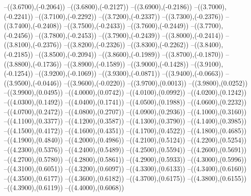 {	--({\sx*(3.6700)},{\sy*(-0.2064)})
	--({\sx*(3.6800)},{\sy*(-0.2127)})
	--({\sx*(3.6900)},{\sy*(-0.2186)})
	--({\sx*(3.7000)},{\sy*(-0.2241)})
	--({\sx*(3.7100)},{\sy*(-0.2292)})
	--({\sx*(3.7200)},{\sy*(-0.2337)})
	--({\sx*(3.7300)},{\sy*(-0.2376)})
	--({\sx*(3.7400)},{\sy*(-0.2408)})
	--({\sx*(3.7500)},{\sy*(-0.2433)})
	--({\sx*(3.7600)},{\sy*(-0.2449)})
	--({\sx*(3.7700)},{\sy*(-0.2456)})
	--({\sx*(3.7800)},{\sy*(-0.2453)})
	--({\sx*(3.7900)},{\sy*(-0.2439)})
	--({\sx*(3.8000)},{\sy*(-0.2414)})
	--({\sx*(3.8100)},{\sy*(-0.2376)})
	--({\sx*(3.8200)},{\sy*(-0.2326)})
	--({\sx*(3.8300)},{\sy*(-0.2262)})
	--({\sx*(3.8400)},{\sy*(-0.2185)})
	--({\sx*(3.8500)},{\sy*(-0.2094)})
	--({\sx*(3.8600)},{\sy*(-0.1989)})
	--({\sx*(3.8700)},{\sy*(-0.1870)})
	--({\sx*(3.8800)},{\sy*(-0.1736)})
	--({\sx*(3.8900)},{\sy*(-0.1589)})
	--({\sx*(3.9000)},{\sy*(-0.1428)})
	--({\sx*(3.9100)},{\sy*(-0.1254)})
	--({\sx*(3.9200)},{\sy*(-0.1069)})
	--({\sx*(3.9300)},{\sy*(-0.0871)})
	--({\sx*(3.9400)},{\sy*(-0.0663)})
	--({\sx*(3.9500)},{\sy*(-0.0446)})
	--({\sx*(3.9600)},{\sy*(-0.0220)})
	--({\sx*(3.9700)},{\sy*(0.0013)})
	--({\sx*(3.9800)},{\sy*(0.0252)})
	--({\sx*(3.9900)},{\sy*(0.0495)})
	--({\sx*(4.0000)},{\sy*(0.0742)})
	--({\sx*(4.0100)},{\sy*(0.0992)})
	--({\sx*(4.0200)},{\sy*(0.1242)})
	--({\sx*(4.0300)},{\sy*(0.1492)})
	--({\sx*(4.0400)},{\sy*(0.1741)})
	--({\sx*(4.0500)},{\sy*(0.1988)})
	--({\sx*(4.0600)},{\sy*(0.2232)})
	--({\sx*(4.0700)},{\sy*(0.2472)})
	--({\sx*(4.0800)},{\sy*(0.2707)})
	--({\sx*(4.0900)},{\sy*(0.2936)})
	--({\sx*(4.1000)},{\sy*(0.3160)})
	--({\sx*(4.1100)},{\sy*(0.3377)})
	--({\sx*(4.1200)},{\sy*(0.3587)})
	--({\sx*(4.1300)},{\sy*(0.3790)})
	--({\sx*(4.1400)},{\sy*(0.3985)})
	--({\sx*(4.1500)},{\sy*(0.4172)})
	--({\sx*(4.1600)},{\sy*(0.4351)})
	--({\sx*(4.1700)},{\sy*(0.4522)})
	--({\sx*(4.1800)},{\sy*(0.4685)})
	--({\sx*(4.1900)},{\sy*(0.4840)})
	--({\sx*(4.2000)},{\sy*(0.4986)})
	--({\sx*(4.2100)},{\sy*(0.5124)})
	--({\sx*(4.2200)},{\sy*(0.5254)})
	--({\sx*(4.2300)},{\sy*(0.5376)})
	--({\sx*(4.2400)},{\sy*(0.5489)})
	--({\sx*(4.2500)},{\sy*(0.5594)})
	--({\sx*(4.2600)},{\sy*(0.5691)})
	--({\sx*(4.2700)},{\sy*(0.5780)})
	--({\sx*(4.2800)},{\sy*(0.5861)})
	--({\sx*(4.2900)},{\sy*(0.5933)})
	--({\sx*(4.3000)},{\sy*(0.5996)})
	--({\sx*(4.3100)},{\sy*(0.6051)})
	--({\sx*(4.3200)},{\sy*(0.6097)})
	--({\sx*(4.3300)},{\sy*(0.6133)})
	--({\sx*(4.3400)},{\sy*(0.6160)})
	--({\sx*(4.3500)},{\sy*(0.6177)})
	--({\sx*(4.3600)},{\sy*(0.6182)})
	--({\sx*(4.3700)},{\sy*(0.6175)})
	--({\sx*(4.3800)},{\sy*(0.6155)})
	--({\sx*(4.3900)},{\sy*(0.6119)})
	--({\sx*(4.4000)},{\sy*(0.6068)})
}
